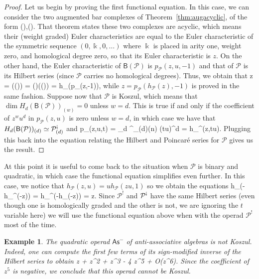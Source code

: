\documentclass[fleqn, a4paper, twoside]{article}
\makeatletter
\newcommand{\antishriek}{\text{\raisebox{\depth}{\textexclamdown}}}
\newcommand{\0}{\langle 0\rangle}
\newcommand{\B}[1]{\mathsf{B}(#1)}
\let\[\@undefined
\DeclareRobustCommand{\[}{\begin{equation}}%
\let\]\@undefined
\DeclareRobustCommand{\]}{\end{equation}}%
\theoremstyle{mytheorem}
\theoremstyle{introthm}
\theoremstyle{mydefinition}
\newtheorem{example}[theorem]{Example}
\theoremstyle{mydefinition2}
\theoremstyle{plain} %
\newcommand{\As}{\mathsf{As}}
\newcommand{\?}{\,?\,}
\newcommand{\kk}{\Bbbk}
\newcommand{\PP}{{\mathcal{P}}}
\theoremstyle{mytheorem}
\theoremstyle{plain} %
\makeatother
\begin{document}
\begin{proof}
Let us begin by proving the first functional equation. In this case,
we can consider the two augmented bar complexes of Theorem~\ref{thm:augacyclic},
of the form
\[
\PP\circ\B{\PP},\qquad \B{\PP}\circ\PP. 
\]
That theorem states these two complexes are acyclic, which means their
(weight graded) Euler characteristics are equal to the Euler characteristic 
of the symmetric sequence $(0,\kk,0,\ldots)$ where $\kk$ is placed in arity one,
weight zero, and homological degree zero, so that its Euler characteristic is
$z$. On the other hand, the Euler characteristic of $\B{\PP}$ is
$p_\PP(z,u,-1)$ and that of $\PP$ is its Hilbert series (since $\PP$ carries no
homological degrees). Thus, we obtain that 
\[
z = \chi(\PP\circ\B{\PP}) = \chi(\PP)\circ \chi(\B{\PP}) = 
		h_\PP(p_\PP(z,-1)),
\]
while $z = p_\PP(h_\PP(z),-1)$ is proved in the same fashion. Suppose
now that $\PP$ is Koszul, which means that $\dim H_d(\B{\PP})_{(w)} = 0$
unless $w=d$. This is true if and only if the coefficient of $z^wu^d$ in
$p_\PP(z,u)$ is zero unless $w=d$, in which case we have that
$H_d(\B{\PP})_{(d)} \simeq  \PP^\antishriek_{(d)}$ and
\[
p_\PP(z,u,t) = \sum_{d} \dim \PP^\antishriek_{(d)}(n) 
	 (tu)^d = h_{\PP^\antishriek}(z,tu).
\]
Plugging this back into the equation relating the Hilbert and Poincar\'e
series for $\PP$ gives us the result.
\end{proof}

At this point it is useful to come back to the situation when $\PP$
is binary and quadratic, in which case the functional equation
simplifies even further. In this case, we notice that
$h_\PP(z,u) = u h_\PP(zu,1)$ so we obtain the equations  
\[
h_\PP(-h_{\PP^\antishriek}(-z)) = h_{\PP^\antishriek}(-h_\PP(-z)) = z. 
\]
Since $\PP^!$ and $\PP^\antishriek$ have the same Hilbert series (even
though one is homologically graded and the other is not, we are
ignoring the $t$ variable here) we will use the functional equation above
when with the operad $\PP^!$ most of the time.



\begin{example}
The quadratic operad $\As^-$ of anti-associative algebras is not Koszul.
Indeed, one can compute the first few terms of its sign-modified inverse of the 
Hilbert series to obtain
\[
z + z^2 + z^3  - 4 z^5 + \textrm{O}(z^{6}).
\]
Since the coefficient of $z^{5}$ is negative, we conclude that this operad cannot be Koszul. 
\end{example}
\end{document}
